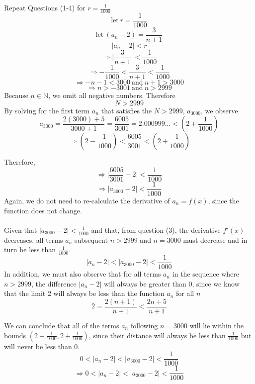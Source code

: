 \documentclass{article}
\newenvironment{problem}[2][Problem]{\begin{trivlist}
\item[\hskip \labelsep {\bfseries #1}\hskip \labelsep {\bfseries #2.}]}{\end{trivlist}}
\newcommand{\N}{\mathbb{N}}
\begin{document}
\begin{problem}{1.5.2}
  Repeat Questions (1-4) for $ r = \frac{1}{1000}$
    \[ \textrm{let}~r =\frac{1}{1000}  \]
    \[ \textrm{let}~(a_{n}-2) = \frac{3}{n+1}\]
    \[ |a_{n}-2| < r \]
  \[ \Rightarrow \Biggr| \frac{3}{n+1} \Biggr| < \frac{1}{1000}\]
  \[ \Rightarrow -\frac{1}{1000} < \frac{3}{n+1} < \frac{1}{1000} \]
  \[ \Rightarrow -n - 1 < 3000 ~\textrm{and}~ n+1 > 3000 \]
  \[ \Rightarrow n > -3001 ~\textrm{and}~ n > 2999 \]
  Because $ n \in \N $, we omit all negative numbers. Therefore
  \[ N > 2999 \]
  By solving for the first term $ a_{n}$ that satisfies
  the  $ N > 2999 $, $ a_{3000} $, we observe
  \[ a_{3000} = \frac{2(3000)+5}{3000+1} = \frac{6005}{3001} =
    2.000999... < (2+\frac{1}{1000}) \]
  \[ \Rightarrow (2-\frac{1}{1000}) < \frac{6005}{3001} < (2+\frac{1}{1000}) \]

  Therefore,
  \[ \Rightarrow \Biggr|\frac{6005}{3001} - 2\Biggr| < \frac{1}{1000} \]
  \[ \Rightarrow  |a_{3000} - 2| < \frac{1}{1000} \]
  Again, we do not need to re-calculate the derivative of $ a_{n} = f(x)$, since the function does not change.
  \\
  \\
  Given that $ |a_{3000} - 2| < \frac{1}{1000} $ and that, from question (3),  the derivative  $ f'(x)$ decreases, all terms $a_{n}$ subsequent  $n > 2999 $ and $ n = 3000 $ must decrease and in turn be less than $ \frac{1}{1000}$.
  \[ |a_{n} - 2| < |a_{3000} - 2| < \frac{1}{1000} \]
  In addition, we must also observe that for all terms $ a_{n} $ in the sequence  where $ n > 2999 $,  the difference $ |a_{n}-2| $ will always
  be greater than 0, since we know that the limit 2 will always
  be less than the function $ a_{n} $ for all $ n$
  \[ 2 = \frac{2(n+1)}{n+1} < \frac{2n+5}{n+1}\]

  We can
  conclude that all of the terms $a_{n}$ following $ n = 3000 $ will
  lie  within the bounds $(2-\frac{1}{1000}, 2+\frac{1}{1000})$, since their distance
  will always be less than $ \frac{1}{1000}$ but will never be less than 0.
  \[ 0 < | a_{n} - 2| < |a_{3000} - 2| < \frac{1}{1000} \]
  \[ \Rightarrow 0 < |a_{n} - 2| < |a_{3000} - 2| < \frac{1}{1000} \]

\end{problem}
\end{document}
